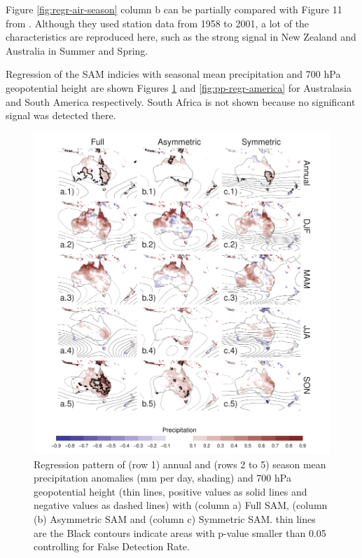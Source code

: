 \documentclass[]{ametsocV5}
\begin{document}
Figure \ref{fig:regr-air-season} column b can be partially compared with
Figure 11 from \citet{fogt2012}. Although they used station data from
1958 to 2001, a lot of the characteristics are reproduced here, such as
the strong signal in New Zealand and Australia in Summer and Spring.

Regression of the SAM indicies with seasonal mean precipitation and 700
hPa geopotential height are shown Figures \ref{fig:pp-regr-oceania} and
\ref{fig:pp-regr-america} for Australasia and South America
respectively. South Africa is not shown because no significant signal
was detected there.

\begin{figure}
\includegraphics{pp-regr-oceania-1} \caption[Regression pattern of (row 1) annual and (rows 2 to 5) season mean precipitation anomalies (mm per day, shading) and 700 hPa geopotential height (thin lines, positive values as solid lines and negative values as dashed lines) with (column a) Full SAM, (column (b) Asymmetric SAM and (column c) Symmetric SAM]{Regression pattern of (row 1) annual and (rows 2 to 5) season mean precipitation anomalies (mm per day, shading) and 700 hPa geopotential height (thin lines, positive values as solid lines and negative values as dashed lines) with (column a) Full SAM, (column (b) Asymmetric SAM and (column c) Symmetric SAM. thin lines are the Black contours indicate areas with p-value smaller than 0.05 controlling for False Detection Rate.}\label{fig:pp-regr-oceania}
\end{figure}
\end{document}
